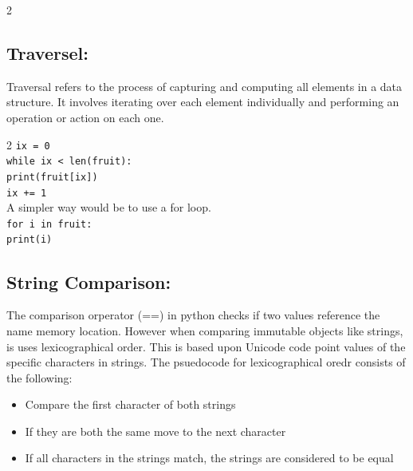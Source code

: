 \documentclass[a4paper]{report}
\begin{document}
\begin{flushleft}
\begin{multicols}{2}
	\subsection*{Traversel:}
	Traversal refers to the process of capturing and computing all elements in a data structure. It involves iterating over each element individually and performing an operation or action on each one.
	\begin{multicols}{2}
		\noindent
		\texttt{ix = 0}\\
		\texttt{while ix < len(fruit):}\\
		\hspace{1em}\texttt{print(fruit[ix])}\\
		\hspace{1em}\texttt{ix += 1}\\

		\columnbreak
		A simpler way would be to use a for loop.\\
		\texttt{for i in fruit:}\\
		\hspace{1em}\texttt{print(i)}
	\end{multicols}
	
	\subsection*{String Comparison:}
	The comparison orperator (==) in python checks if two values reference the name memory location. However when comparing immutable objects like strings, is uses lexicographical order. This is based upon Unicode code point values of the specific characters in strings. The psuedocode for lexicographical oredr consists of the following:
	\begin{itemize}
		\item Compare the first character of both strings
		\item If they are both the same move to the next character
		\item If all characters in the strings match, the strings are considered to be equal
	\end{itemize}


\end{multicols}
\end{flushleft}
\end{document}
